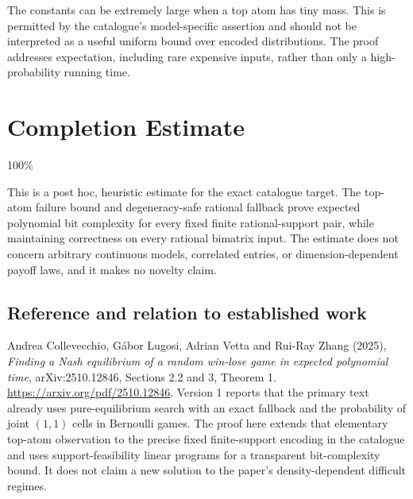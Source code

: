 \documentclass[11pt,a4paper]{article}
\begin{document}
The constants can be extremely large when a top atom has tiny mass. This is permitted by the catalogue's model-specific assertion and should not be interpreted as a useful uniform bound over encoded distributions. The proof addresses expectation, including rare expensive inputs, rather than only a high-probability running time.

\section{Completion Estimate}
100\%

This is a post hoc, heuristic estimate for the exact catalogue target.
The top-atom failure bound and degeneracy-safe rational fallback prove expected polynomial bit complexity for every fixed finite rational-support pair, while maintaining correctness on every rational bimatrix input. The estimate does not concern arbitrary continuous models, correlated entries, or dimension-dependent payoff laws, and it makes no novelty claim.

\subsection*{Reference and relation to established work}
Andrea Collevecchio, G\'abor Lugosi, Adrian Vetta and Rui-Ray Zhang (2025), \emph{Finding a Nash equilibrium of a random win-lose game in expected polynomial time}, arXiv:2510.12846, Sections 2.2 and 3, Theorem 1. \url{https://arxiv.org/pdf/2510.12846}. Version 1 reports that the primary text already uses pure-equilibrium search with an exact fallback and the probability of joint $(1,1)$ cells in Bernoulli games. The proof here extends that elementary top-atom observation to the precise fixed finite-support encoding in the catalogue and uses support-feasibility linear programs for a transparent bit-complexity bound. It does not claim a new solution to the paper's density-dependent difficult regimes.
\end{document}
